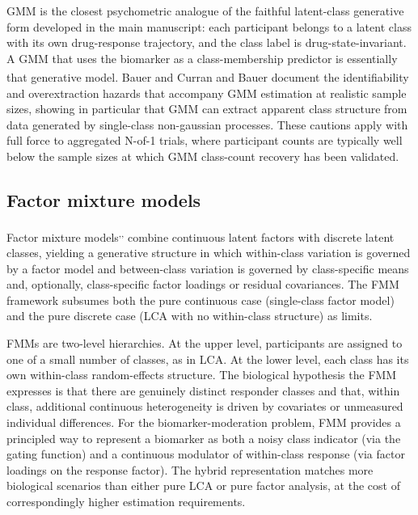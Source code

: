 \documentclass[
  11pt,
]{article}
\begin{document}
GMM is the closest psychometric analogue of the faithful latent-class
generative form developed in the main manuscript: each participant
belongs to a latent class with its own drug-response trajectory, and
the class label is drug-state-invariant. A GMM that uses the biomarker
as a class-membership predictor is essentially that generative model.
Bauer and Curran\textsuperscript{} and Bauer\textsuperscript{} document
the identifiability and overextraction hazards that accompany GMM
estimation at realistic sample sizes, showing in particular that GMM
can extract apparent class structure from data generated by
single-class non-gaussian processes. These cautions apply with full
force to aggregated N-of-1 trials, where participant counts are
typically well below the sample sizes at which GMM class-count
recovery has been validated.

\subsection{Factor mixture models}\label{factor-mixture-models}

Factor mixture models\textsuperscript{,,}
combine continuous latent factors with discrete latent classes,
yielding a generative structure in which within-class variation is
governed by a factor model and between-class variation is governed by
class-specific means and, optionally, class-specific factor loadings or
residual covariances. The FMM framework subsumes both the pure
continuous case (single-class factor model) and the pure discrete case
(LCA with no within-class structure) as limits.

FMMs are two-level hierarchies. At the upper level, participants are
assigned to one of a small number of classes, as in LCA. At the lower
level, each class has its own within-class random-effects structure.
The biological hypothesis the FMM expresses is that there are genuinely
distinct responder classes and that, within class, additional
continuous heterogeneity is driven by covariates or unmeasured
individual differences. For the biomarker-moderation problem, FMM
provides a principled way to represent a biomarker as both a noisy
class indicator (via the gating function) and a continuous modulator of
within-class response (via factor loadings on the response factor). The
hybrid representation matches more biological scenarios than either
pure LCA or pure factor analysis, at the cost of correspondingly higher
estimation requirements.
\end{document}
